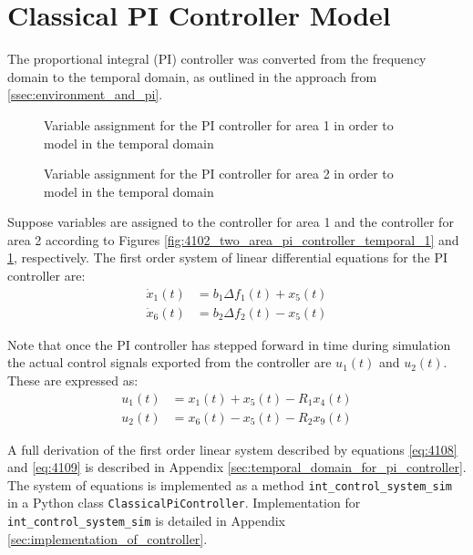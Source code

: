 \section{Classical PI Controller Model}
The proportional integral (PI) controller was converted from the frequency domain to the temporal domain, as outlined in the approach from \textsection \ref{ssec:environment_and_pi}.

\begin{figure}[h]
	\begin{minipage}[b]{0.5\textwidth}
		\resizebox{7.0cm}{!}{}
		\caption[Area 1 PI controller ODE derivation]{Variable assignment for the PI controller for area 1 in order to model in the temporal domain}
		\label{fig:4102_two_area_pi_controller_temporal_1}
	\end{minipage}
	\hspace{0.1cm}
	\begin{minipage}[b]{0.5\textwidth}
		\resizebox{7.2cm}{!}{}
		\caption[Area 2 PI controller ODE derivation]{Variable assignment for the PI controller for area 2 in order to model in the temporal domain}
		\label{fig:4103_two_area_pi_controller_temporal_2}
	\end{minipage}
\end{figure}

Suppose variables are assigned to the controller for area 1 and the controller for area 2 according to Figures \ref{fig:4102_two_area_pi_controller_temporal_1} and \ref{fig:4103_two_area_pi_controller_temporal_2}, respectively. The first order system of linear differential equations for the PI controller are:
\begin{align}
	\dot{x}_1(t) &= b_1 \Delta f_1(t) + x_5(t) \label{eq:4108} \\
	\dot{x}_6(t) &= b_2 \Delta f_2(t) - x_5(t) \label{eq:4109}
\end{align}

Note that once the PI controller has stepped forward in time during simulation the actual control signals exported from the controller are $u_1(t)$ and $u_2(t)$. These are expressed as:
\begin{align}
	u_1(t) &= x_1(t) + x_5(t) - R_1 x_4(t) \\
	u_2(t) &= x_6(t) - x_5(t) - R_2 x_9(t) 
\end{align}

A full derivation of the first order linear system described by equations \ref{eq:4108} and \ref{eq:4109} is described in Appendix \ref{sec:temporal_domain_for_pi_controller}. The system of equations is implemented as a method \verb|int_control_system_sim| in a Python class \verb|ClassicalPiController|. Implementation for \verb|int_control_system_sim| is detailed in Appendix \ref{sec:implementation_of_controller}.

